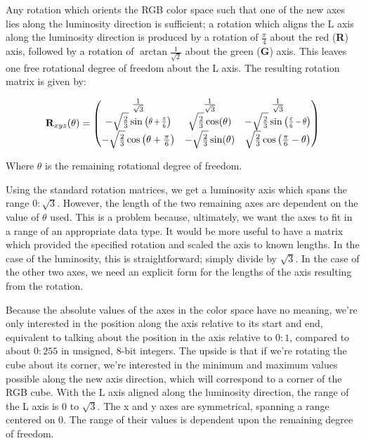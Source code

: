 Any rotation which orients the RGB color space such that one of the new axes lies along the luminosity direction is sufficient; a rotation which aligns the L axis along the luminosity direction is produced by a rotation of $\frac{\pi}4$ about the red (\textbf{R}) axis, followed by a rotation of $\arctan{\frac{1}{\sqrt{2}}}$ about the green (\textbf{G}) axis. This leaves one free rotational degree of freedom about the L axis. The resulting rotation matrix is given by:

\begin{equation}\label{eq:RotationMatrix}
\R_{xyz}(\theta) =
\begin{pmatrix}
 \frac{1}{\sqrt{3}} & \frac{1}{\sqrt{3}} & \frac{1}{\sqrt{3}} \\
 -\sqrt{\frac{2}{3}} \sine{\theta +\Pii{6} } & \sqrt{\frac{2}{3}} \cos (\theta ) & -\sqrt{\frac{2}{3}} \sine{\Pii{6}-\theta } \\
 -\sqrt{\frac{2}{3}} \cos \left(\theta +\Pii{6}\right) & -\sqrt{\frac{2}{3}} \sin (\theta ) & \sqrt{\frac{2}{3}} \cos \left(\Pii{6}-\theta \right) \\
\end{pmatrix}
\end{equation}


Where $\theta$ is the remaining rotational degree of freedom.

Using the standard rotation matrices, we get a luminosity axis which spans the range $0:\sqrt{3}$. However, the length of the two remaining axes are dependent on the value of $\theta$ used. This is a problem because, ultimately, we want the axes to fit in a range of an appropriate data type. It would be more useful to have a matrix which provided the specified rotation and scaled the axis to known lengths. In the case of the luminosity, this is straightforward; simply divide by $\sqrt{3}$. In the case of the other two axes, we need an explicit form for the lengths of the axis resulting from the rotation.

Because the absolute values of the axes in the color space have no meaning, we're only interested in the position along the axis relative to its start and end, equivalent to talking about the position in the axis relative to $0:1$, compared to about $0:255$ in unsigned, 8-bit integers. The upside is that if we're rotating the cube about its corner, we're interested in the minimum and maximum values possible along the new axis direction, which will correspond to a corner of the RGB cube. With the L axis aligned along the luminosity direction, the range of the L axis is 0 to $\sqrt{3}$. The x and y axes are symmetrical, spanning a range centered on 0. The range of their values is dependent upon the remaining degree of freedom.

